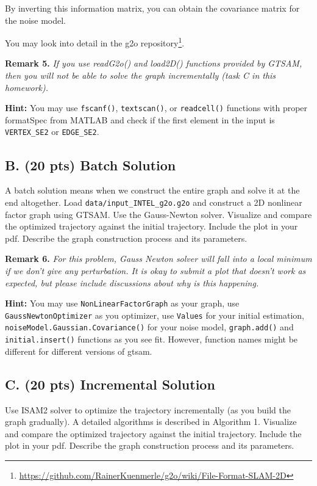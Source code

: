 \documentclass[tp]{lcc}
\begin{document}
By inverting this information matrix, you can obtain the covariance matrix for the noise model.

You may look into detail in the g2o repository\footnote{\url{https://github.com/RainerKuenmerle/g2o/wiki/File-Format-SLAM-2D}}.

\textbf{Remark 5.} \textit{If you use readG2o() and load2D() functions provided by GTSAM, then you will not be able to solve the graph incrementally (task C in this homework).}

\textbf{Hint:} You may use \texttt{fscanf()}, \texttt{textscan()}, or \texttt{readcell()} functions with proper formatSpec from MATLAB and check if the first element in the input is \texttt{VERTEX\_SE2} or \texttt{EDGE\_SE2}.

\subsection{B. (20 pts) Batch Solution}
A batch solution means when we construct the entire graph and solve it at the end altogether. Load \texttt{data/input\_INTEL\_g2o.g2o} and construct a 2D nonlinear factor graph using GTSAM. Use the Gauss-Newton solver. Visualize and compare the optimized trajectory against the initial trajectory. Include the plot in your pdf. Describe the graph construction process and its parameters.

\textbf{Remark 6.} \textit{For this problem, Gauss Newton solver will fall into a local minimum if we don't give any perturbation. It is okay to submit a plot that doesn't work as expected, but please include discussions about why is this happening.}

\textbf{Hint:} You may use \texttt{NonLinearFactorGraph} as your graph, use \texttt{GaussNewtonOptimizer} as you optimizer, use \texttt{Values} for your initial estimation, \texttt{noiseModel.Gaussian.Covariance()} for your noise model, \texttt{graph.add()} and \texttt{initial.insert()} functions as you see fit. However, function names might be different for different versions of gtsam.

\subsection{C. (20 pts) Incremental Solution}
Use ISAM2 solver to optimize the trajectory incrementally (as you build the graph gradually). A detailed algorithms is described in Algorithm 1. Visualize and compare the optimized trajectory against the initial trajectory. Include the plot in your pdf. Describe the graph construction process and its parameters.
\end{document}
